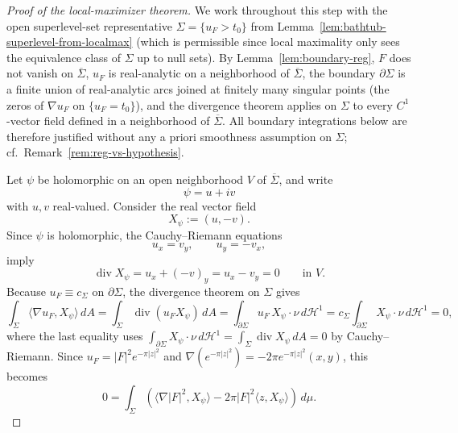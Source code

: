 \documentclass[a4paper,11pt,reqno]{amsart}
\numberwithin{equation}{section}
\theoremstyle{plain} %
\theoremstyle{definition} %
\theoremstyle{remark}
\begin{document}
\begin{proof}[Proof of the local-maximizer theorem]
We work throughout this step with the open superlevel-set representative
\(\Sigma=\{u_F>t_0\}\) from
Lemma~\ref{lem:bathtub-superlevel-from-localmax} (which is permissible since
local maximality only sees the equivalence class of \(\Sigma\) up to null
sets). By Lemma~\ref{lem:boundary-reg}, \(F\) does not vanish on
\(\overline\Sigma\), \(u_F\) is real-analytic on a neighborhood of
\(\overline\Sigma\), the boundary \(\partial\Sigma\) is a finite union of
real-analytic arcs joined at finitely many singular points (the zeros of
\(\nabla u_F\) on \(\{u_F=t_0\}\)), and the divergence theorem applies on
\(\Sigma\) to every \(C^1\)-vector field defined in a neighborhood of
\(\overline\Sigma\). All boundary integrations below are therefore justified
without any a priori smoothness assumption on \(\Sigma\); cf.\
Remark~\ref{rem:reg-vs-hypothesis}.

Let \(\psi\) be holomorphic on an open neighborhood \(V\) of
\(\overline \Sigma\), and write
\[
\psi=u+iv
\]
with \(u,v\) real-valued. Consider the real vector field
\[
X_\psi:=(u,-v).
\]
Since \(\psi\) is holomorphic, the Cauchy--Riemann equations
\[
u_x=v_y,
\qquad
u_y=-v_x,
\]
imply
\[
\operatorname{div}X_\psi=u_x+(-v)_y=u_x-v_y=0
\qquad \text{in }V.
\]
Because \(u_F\equiv c_\Sigma\) on \(\partial\Sigma\), the divergence theorem on
\(\Sigma\) gives
\[
\int_\Sigma \langle \nabla u_F, X_\psi\rangle\,dA
=
\int_\Sigma \operatorname{div}(u_F X_\psi)\,dA
=
\int_{\partial \Sigma} u_F\, X_\psi\cdot \nu\, d\mathcal H^1
=
c_\Sigma\int_{\partial \Sigma} X_\psi\cdot \nu\, d\mathcal H^1
=
0,
\]
where the last equality uses
\(\int_{\partial\Sigma}X_\psi\cdot\nu\,d\mathcal H^1
=\int_\Sigma\operatorname{div}X_\psi\,dA=0\) by Cauchy--Riemann. Since
\(u_F=|F|^2e^{-\pi |z|^2}\) and
\(\nabla(e^{-\pi|z|^2})=-2\pi e^{-\pi|z|^2}(x,y)\), this becomes
\begin{equation}\label{eq:vector-field-identity-real-new}
0=
\int_\Sigma
\left(
\langle \nabla |F|^2,X_\psi\rangle
-
2\pi |F|^2 \langle z,X_\psi\rangle
\right)
\,d\mu.
\end{equation}


\end{proof}
\end{document}
